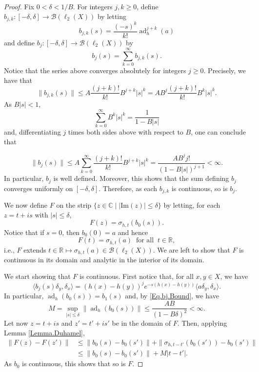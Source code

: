 \documentclass[11pt]{amsart}
\newcommand{\R}{\mathbb{R}}
\newcommand{\C}{\mathbb{C}}
\newcommand{\cB}{\mathcal{B}}
\numberwithin{equation}{section}
\theoremstyle{definition}
\theoremstyle{remark}
\DeclareMathOperator{\ad}{ad}
\begin{document}
\begin{proof}
Fix $0<\delta<1/B$. For   integers $j,k\geq 0$, define $b_{j,k}\colon [-\delta,\delta]\to \cB(\ell_2(X))$   by letting
\[b_{j,k}(s)=\frac{(-s)^k}{k!}\ad_h^{j+k}(a)\]
and define $b_{j}\colon [-\delta,\delta]\to \cB(\ell_2(X))$  by
\[b_j(s)=\sum_{k=0}^\infty b_{j,k}(s).\]
Notice that the series above converges  absolutely for integers $j\geq 0 $. Precisely, we have that
\[\|b_{j,k}(s)\|\leq A\frac{(j+k)!}{k!}B^{j+k}|s|^k=A B^j \frac{(j+k)!}{k!} B^k|s|^k.\]
As $B|s|<1$,
\[\sum_{k=0}^\infty B^k|s|^k=\frac{1}{1-B|s|}\] and, differentiating $j$ times both sides above with respect to $B$, one can conclude that

\begin{equation}\label{Eq.bj.Bound}\|b_j(s)\|\leq
A\sum_{k=0}^\infty\frac{(j+k)!}{k!}B^{j+k}|s|^k=\frac{AB^jj!}{(1-B|s|)^{j+1}}<\infty.
\end{equation}
In particular, $b_j$  is well defined. Moreover,   this shows that the sum defining $b_j$ converges uniformly on $[-\delta,\delta]$. Therefore, as each   $b_{j,k}$ is continuous, so is $b_j$.


We now define $F$ on the strip  $\{z\in \C\mid |\mathrm{Im}(z)|\leq \delta\}$ by letting, for each $z=t+is$ with $|s|\leq\delta$,
\[F(z)=\sigma_{h,t}(b_0(s)).\]
Notice that if $s=0$, then $b_0(0)=a$ and hence    \[F(t)=\sigma_{h,t}(a)\ \text{   for all }\ t\in\R,\] i.e., $F$ extends $t\in \R\mapsto\sigma_{h,t}(a)\in \cB(\ell_2(X))$. We are left to show that $F$ is continuous in its domain and analytic in the interior of its domain.


We start showing that $F$ is continuous. First notice that, for all $x,y\in X$, we have
\begin{equation}\label{Eq.bj.entries}\langle b_j(s)\delta_y,\delta_x\rangle=(h(x)-h(y))^je^{-s(h(x)-h(y))}\langle a\delta_y,\delta_x\rangle.\end{equation}
In particular, $\ad_h(b_0(s))=b_1(s)$ and,   by \eqref{Eq.bj.Bound}, we have
\[M=\sup_{|s|\leq\delta}\|\ad_h(b_0(s))\|\leq \frac{AB}{(1-B\delta)^{2}}<\infty.\]
Let now     $z=t+is$ and $z'=t'+is'$ be in the domain of $F$. Then,  applying Lemma \ref{Lemma.Duhamel},
\begin{align*}\|F(z)-F(z')\|&\leq \|b_0(s)-b_0(s')\|+\|\sigma_{h,t-t'}(b_0(s'))-b_0(s')\|\\
&\leq \|b_0(s)-b_0(s')\|+M|t-t'| .
\end{align*}
As $b_0$ is continuous, this shows that so is $F$.












\end{proof}
\end{document}
